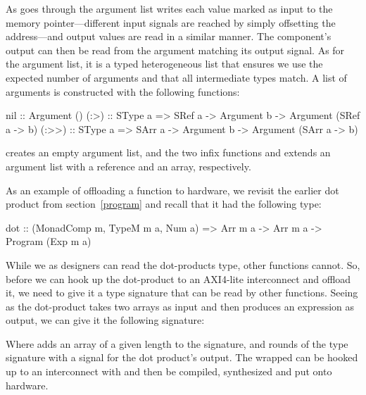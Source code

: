 \documentclass[../paper.tex]{subfiles}
\begin{document}
\noindent As  goes through the argument list writes each value marked as input to the memory pointer---different input signals are reached by simply offsetting the address---and output values are read in a similar manner. The component's output can then be read from the argument matching its output signal. As for the argument list, it is a typed heterogeneous list that ensures we use the expected number of arguments and that all intermediate types match. A list of arguments is constructed with the following functions:


\begin{code}
nil   :: Argument ()
(:>)  :: SType a => SRef a -> Argument b -> Argument (SRef a -> b)
(:>>) :: SType a => SArr a -> Argument b -> Argument (SArr a -> b)
\end{code}

\noindent {} creates an empty argument list, and the two infix functions \codei{(:>)} and \codei{(:>>)} extends an argument list with a reference and an array, respectively.

As an example of offloading a function to hardware, we revisit the earlier dot product from section~\ref{program} and recall that it had the following type:

\begin{code}
dot :: (MonadComp m, TypeM m a, Num a) => Arr m a -> Arr m a
  -> Program (Exp m a)
\end{code}

\noindent While we as designers can read the dot-products type, other functions cannot. So, before we can hook up the dot-product to an AXI4-lite interconnect and offload it, we need to give it a type signature that can be read by other functions. Seeing as the dot-product takes two arrays as input and then produces an expression as output, we can give it the following signature:


\noindent Where  adds an array of a given length to the signature, and  rounds of the type signature with a signal for the dot product's output. The wrapped  can be hooked up to an interconnect with  and then be compiled, synthesized and put onto hardware.
\end{document}
